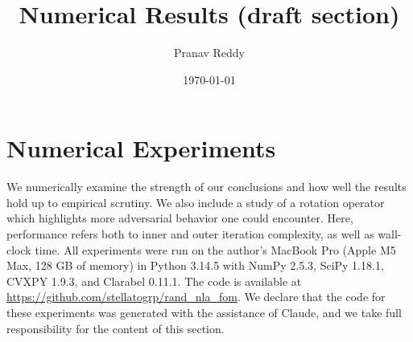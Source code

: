 \documentclass[11pt]{article}
\title{Numerical Results (draft section)}
\author{Pranav Reddy}
\date{\today}
\begin{document}
  \maketitle
\fi

\section{Numerical Experiments}\label{sec:numerical-experiments}
We numerically examine the strength of our conclusions and how well the results hold up to empirical scrutiny.
We also include a study of a rotation operator which highlights more adversarial behavior one could encounter.
Here, performance refers both to inner and outer iteration complexity, as well as wall-clock time.
All experiments were run on the author's MacBook Pro (Apple M5 Max, 128 GB of memory) in Python 3.14.5 with NumPy 2.5.3, SciPy 1.18.1, CVXPY 1.9.3, and Clarabel 0.11.1.
The code is available at \url{https://github.com/stellatogrp/rand_nla_fom}.
We declare that the code for these experiments was generated with the assistance of Claude, and we take full responsibility for the content of this section.
\end{document}
